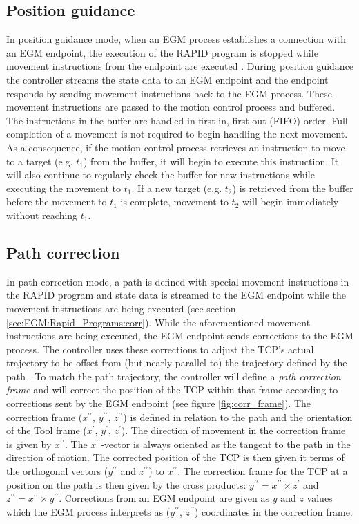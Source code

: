 \documentclass{cslthse-msc}
\begin{document}
\subsection{Position guidance}
\label{sec:EGM:Modes:guidance}
In position guidance mode, when an EGM process establishes a connection with an EGM endpoint, the execution of the RAPID program is stopped while movement instructions from the endpoint are executed \cite[Sec. 9.3.1.3]{ABB:controller_software}. During position guidance the controller streams the state data to an EGM endpoint and the endpoint responds by sending movement instructions back to the EGM process. These movement instructions are passed to the motion control process and buffered. The instructions in the buffer are handled in first-in, first-out (FIFO) order. Full completion of a movement is not required to begin handling the next movement. As a consequence, if the motion control process retrieves an instruction to move to a target (e.g. $t_1$) from the buffer, it will begin to execute this instruction. It will also continue to regularly check the buffer for new instructions while executing the movement to $t_1$. If a new target (e.g. $t_2$) is retrieved from the buffer before the movement to $t_1$ is complete, movement to $t_2$ will begin immediately without reaching $t_1$. 

\subsection{Path correction}
\label{sec:EGM:Modes:corr}
In path correction mode, a path is defined with special movement instructions in the RAPID program and state data is streamed to the EGM endpoint while the movement instructions are being executed (see section \ref{sec:EGM:Rapid_Programs:corr}). While the aforementioned movement instructions are being executed, the EGM endpoint sends corrections to the EGM process. The controller uses these corrections to adjust the TCP's actual trajectory to be offset from (but nearly parallel to) the trajectory defined by the path \cite[Sec. 9.3.1.4]{ABB:controller_software}. To match the path trajectory, the controller will define a \textit{path correction frame} and will correct the position of the TCP within that frame according to corrections sent by the EGM endpoint (see figure \ref{fig:corr_frame}). The correction frame ($x^{\prime\prime}$, $y^{\prime\prime}$, $z^{\prime\prime}$) is defined in relation to the path and the orientation of the Tool frame ($x^{\prime}$, $y^{\prime}$, $z^{\prime}$). The direction of movement in the correction frame is given by $x^{\prime\prime}$. The $x^{\prime\prime}$-vector is always oriented as the tangent to the path in the direction of motion. The corrected position of the TCP is then given it terms of the orthogonal vectors ($y^{\prime\prime}$ and $z^{\prime\prime}$) to $x^{\prime\prime}$. The correction frame for the TCP at a position on the path is then given by the cross products: $y^{\prime\prime} = x^{\prime\prime} \times z^{\prime}$ and $z^{\prime\prime} = x^{\prime\prime} \times y^{\prime\prime}$. Corrections from an EGM endpoint are given as $y$ and $z$ values which the EGM process interprets as ($y^{\prime\prime}$, $z^{\prime\prime}$) coordinates in the correction frame. 
\end{document}
